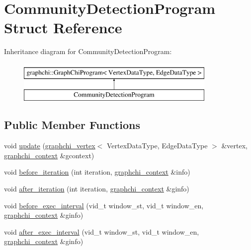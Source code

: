 \hypertarget{struct_community_detection_program}{\section{Community\-Detection\-Program Struct Reference}
\label{struct_community_detection_program}
}
Inheritance diagram for Community\-Detection\-Program\-:\begin{figure}[H]
\begin{center}
\leavevmode
\includegraphics[height=2.000000cm]{struct_community_detection_program}
\end{center}
\end{figure}
\subsection*{Public Member Functions}
\begin{DoxyCompactItemize}
\item 
void \hyperlink{struct_community_detection_program_aa371bbe8d4e79cb7cc512d9f77e9496c}{update} (\hyperlink{classgraphchi_1_1graphchi__vertex}{graphchi\-\_\-vertex}$<$ Vertex\-Data\-Type, Edge\-Data\-Type $>$ \&vertex, \hyperlink{structgraphchi_1_1graphchi__context}{graphchi\-\_\-context} \&gcontext)
\item 
void \hyperlink{struct_community_detection_program_a3dde791f5dec796cd9c6e0a61da114cc}{before\-\_\-iteration} (int iteration, \hyperlink{structgraphchi_1_1graphchi__context}{graphchi\-\_\-context} \&info)
\item 
void \hyperlink{struct_community_detection_program_ad7a1b4c6b9dcb29a2b4286d123044c2e}{after\-\_\-iteration} (int iteration, \hyperlink{structgraphchi_1_1graphchi__context}{graphchi\-\_\-context} \&ginfo)
\item 
void \hyperlink{struct_community_detection_program_aa8a15b9afd3731712ac3e01a9491d7c1}{before\-\_\-exec\-\_\-interval} (vid\-\_\-t window\-\_\-st, vid\-\_\-t window\-\_\-en, \hyperlink{structgraphchi_1_1graphchi__context}{graphchi\-\_\-context} \&ginfo)
\item 
void \hyperlink{struct_community_detection_program_a76118f786af150806ed45fb4cb1b18e3}{after\-\_\-exec\-\_\-interval} (vid\-\_\-t window\-\_\-st, vid\-\_\-t window\-\_\-en, \hyperlink{structgraphchi_1_1graphchi__context}{graphchi\-\_\-context} \&ginfo)
\end{DoxyCompactItemize}
